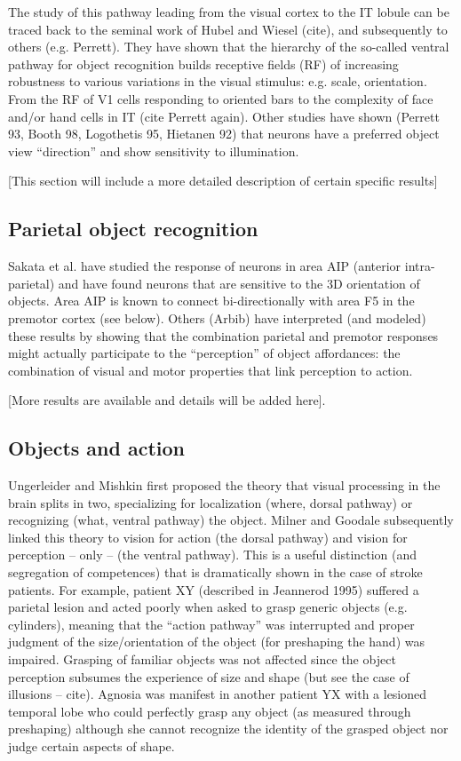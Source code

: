 The study of this pathway leading from the visual cortex to the IT lobule can be traced back to the seminal work of Hubel and Wiesel (cite), and subsequently to others (e.g. Perrett). They have shown that the hierarchy of the so-called ventral pathway for object recognition builds receptive fields (RF) of increasing robustness to various variations in the visual stimulus: e.g. scale, orientation. From the RF of V1 cells responding to oriented bars to the complexity of face and/or hand cells in IT (cite Perrett again). Other studies have shown (Perrett 93, Booth 98, Logothetis 95, Hietanen 92) that neurons have a preferred object view ``direction'' and show sensitivity to illumination.

[This section will include a more detailed description of certain specific results]


\subsection{Parietal object recognition}
Sakata et al. have studied the response of neurons in area AIP (anterior intra-parietal) and have found neurons that are sensitive to the 3D orientation of objects. Area AIP is known to connect bi-directionally with area F5 in the premotor cortex (see below). Others (Arbib) have interpreted (and modeled) these results by showing that the combination parietal and premotor responses might actually participate to the ``perception'' of object affordances: the combination of visual and motor properties that link perception to action.

[More results are available and details will be added here].


\subsection{Objects and action}

Ungerleider and Mishkin first proposed the theory that visual processing in the brain splits in two, specializing for localization (where, dorsal pathway) or recognizing (what, ventral pathway) the object. Milner and Goodale subsequently linked this theory to vision for action (the dorsal pathway) and vision for perception -- only -- (the ventral pathway). This is a useful distinction (and segregation of competences) that is dramatically shown in the case of stroke patients. For example, patient XY (described in Jeannerod 1995) suffered a parietal lesion and acted poorly when asked to grasp generic objects (e.g. cylinders), meaning that the ``action pathway'' was interrupted and proper judgment of the size/orientation of the object (for preshaping the hand) was impaired. Grasping of familiar objects was not affected since the object perception subsumes the experience of size and shape (but see the case of illusions -- cite). Agnosia was manifest in another patient YX with a lesioned temporal lobe who could perfectly grasp any object (as measured through preshaping) although she cannot recognize the identity of the grasped object nor judge certain aspects of shape.

